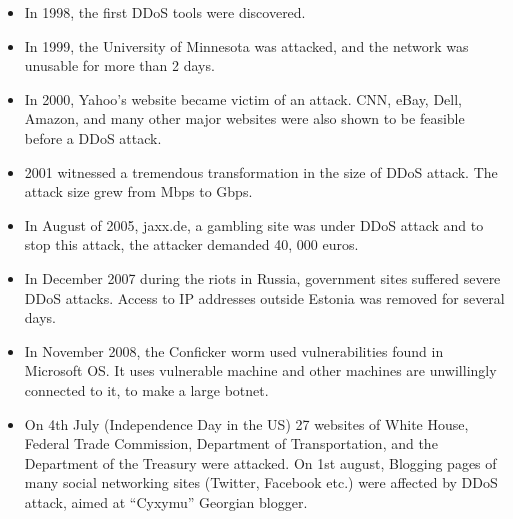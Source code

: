 \documentclass[twocolumn]{article}
\begin{document}
\begin{itemize}
\item In 1998, the first DDoS tools were discovered.
\item In 1999, the University of Minnesota was attacked, and the network was unusable for more than 2 days.
\item In 2000, Yahoo’s website became victim of an attack. CNN, eBay, Dell, Amazon, and many other major websites were also shown to be feasible before a DDoS attack.
\item 2001 witnessed a tremendous transformation in the size of DDoS attack. The attack size grew from Mbps to Gbps.
\item In August of 2005, jaxx.de, a gambling site was under DDoS attack and to stop this attack, the attacker demanded 40, 000 euros.
\item In December 2007 during the riots in Russia, government sites suffered severe DDoS attacks. Access to IP addresses outside Estonia was removed for several days.
\item In November 2008, the Conficker worm used vulnerabilities found in Microsoft OS. It uses vulnerable machine and other machines are unwillingly connected to it, to make a large botnet.
\item On 4th July (Independence Day in the US) 27 websites of White House, Federal Trade Commission, Department of Transportation, and the Department of the Treasury were attacked. On 1st august, Blogging pages of many social networking sites (Twitter, Facebook etc.) were affected by DDoS attack, aimed at “Cyxymu” Georgian blogger.
\end{itemize}
\end{document}
